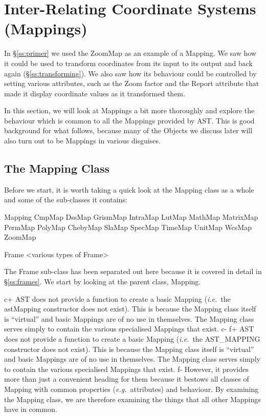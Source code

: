 \documentclass[twoside,11pt]{starlink}
\providecommand{\secref}[1]{\S\ref{#1}}
\begin{document}
\cleardoublepage
\section{\label{ss:mappings}Inter-Relating Coordinate Systems (Mappings)}

In \secref{ss:primer} we used the ZoomMap as an example of a
Mapping. We saw how it could be used to transform coordinates from its
input to its output and back again (\secref{ss:transforming}). We also
saw how its behaviour could be controlled by setting various
attributes, such as the Zoom factor and the Report attribute that made
it display coordinate values as it transformed them.

In this section, we will look at Mappings a bit more thoroughly and
explore the behaviour which is common to all the Mappings provided by
AST.  This is good background for what follows, because many of the
Objects we discuss later will also turn out to be Mappings in various
disguises.

\subsection{\label{ss:mappingclass}The Mapping Class}

Before we start, it is worth taking a quick look at the Mapping class
as a whole and some of the sub-classes it contains:

\begin{terminalv}
   Mapping
      CmpMap
      DssMap
      GrismMap
      IntraMap
      LutMap
      MathMap
      MatrixMap
      PermMap
      PolyMap
         ChebyMap
      SlaMap
      SpecMap
      TimeMap
      UnitMap
      WcsMap
      ZoomMap

      Frame
         <various types of Frame>
\end{terminalv}

The Frame sub-class has been separated out here because it is covered
in detail in \secref{ss:frames}. We start by looking at the parent
class, Mapping.

c+
AST does not provide a function to create a basic Mapping
(\emph{i.e.}\ the astMapping constructor does not exist). This is
because the Mapping class itself is ``virtual'' and basic Mappings are
of no use in themselves. The Mapping class serves simply to contain
the various specialised Mappings that exist.
c-
f+
AST does not provide a function to create a basic Mapping
(\emph{i.e.}\ the AST\_MAPPING constructor does not exist). This is
because the Mapping class itself is ``virtual'' and basic Mappings are
of no use in themselves. The Mapping class serves simply to contain
the various specialised Mappings that exist.
f-
However, it provides more than just a convenient heading for them
because it bestows all classes of Mapping with common properties
(\emph{e.g.}\ attributes) and behaviour.  By examining the Mapping
class, we are therefore examining the things that all other Mappings
have in common.
\end{document}

